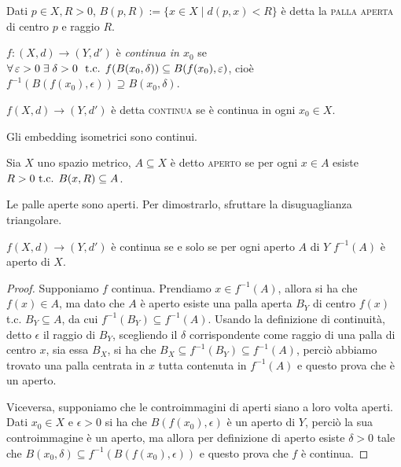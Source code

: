\begin{defn}
    Dati $p \in X, R>0$, ${B(p, R):=\{ x \in X \mid d(p, x)<R\}}$ è detta la
    \textsc{palla aperta} di centro $p$ e raggio $R$.
\end{defn}

\begin{defn}
    ${f:(X, d) \rightarrow (Y, d')}$ è \textit{continua in $x_0$} se ${\forall
    \epsilon > 0 \; \exists \; \delta >0}\\\ \tc {f(B(x_0, \delta)) \subseteq
    B(f(x_0), \epsilon)}$, cioè ${f^{-1}(B(f(x_0), \epsilon)) \supseteq B(x_0,
    \delta)}$.
\end{defn}

\begin{defn}
    ${f(X, d) \rightarrow (Y, d')}$ è detta \textsc{continua} se è continua in
    ogni ${x_0 \in X}$.
\end{defn}

\begin{oss}
    Gli embedding isometrici sono continui.
\end{oss}

\begin{defn}
    Sia $X$ uno spazio metrico, $A \subseteq X$ è detto \textsc{aperto} se per
    ogni $x \in A$ esiste ${R>0 \text{ t.c. } B(x, R) \subseteq A}$.
\end{defn}

\begin{ftt}
    Le palle aperte sono aperti. Per dimostrarlo, sfruttare la disuguaglianza
    triangolare.
\end{ftt}

\begin{thm} \label{thm:cont_inv}
    $f(X, d) \rightarrow (Y, d')$ è continua se e solo se per ogni aperto $A$ di
    $Y$ $f^{-1}(A)$ è aperto di $X$.
\end{thm}

\begin{proof}
    Supponiamo $f$ continua. Prendiamo $x \in f^{-1}(A)$, allora si ha che $f(x)
    \in A$, ma dato che $A$ è aperto esiste una palla aperta $B_Y$ di centro
    $f(x)$
     t.c. $B_Y \subseteq A$, da cui $f^{-1}(B_Y) \subseteq f^{-1}(A)$.
    Usando la definizione di continuità, detto $\epsilon$ il raggio di $B_Y$,
    scegliendo il $\delta$ corrispondente come raggio di una palla di centro
    $x$, sia essa $B_X$, si ha che $B_X \subseteq f^{-1}(B_Y) \subseteq
    f^{-1}(A)$, perciò abbiamo trovato una palla centrata in $x$ tutta contenuta
    in $f^{-1}(A)$ e questo prova che è un aperto.

    Viceversa, supponiamo che le controimmagini di aperti siano a loro volta
    aperti. Dati $x_0 \in X$ e $\epsilon >0$ si ha che $B(f(x_0), \epsilon)$ è
    un aperto di $Y$, perciò la sua controimmagine è un aperto, ma allora per
    definizione di aperto esiste $\delta>0$ tale che $B(x_0, \delta) \subseteq
    f^{-1}(B(f(x_0), \epsilon))$ e questo prova che $f$ è continua.
\end{proof}

